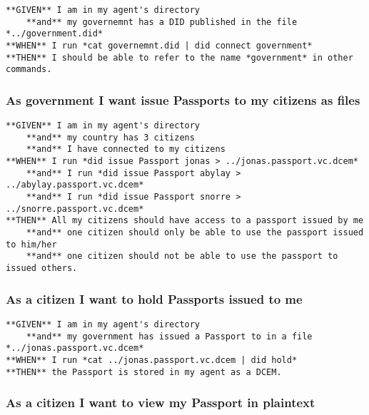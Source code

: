 \begin{lstlisting}
**GIVEN** I am in my agent's directory
    **and** my governemnt has a DID published in the file *../government.did*
**WHEN** I run *cat governemnt.did | did connect government*
**THEN** I should be able to refer to the name *government* in other commands.
\end{lstlisting}

\hypertarget{as-government-i-want-issue-passports-to-my-citizens-as-files}{%
\subsubsection{As government I want issue Passports to my citizens as
files}\label{as-government-i-want-issue-passports-to-my-citizens-as-files}}

\begin{lstlisting}
**GIVEN** I am in my agent's directory
    **and** my country has 3 citizens
    **and** I have connected to my citizens
**WHEN** I run *did issue Passport jonas > ../jonas.passport.vc.dcem*
    **and** I run *did issue Passport abylay > ../abylay.passport.vc.dcem*
    **and** I run *did issue Passport snorre > ../snorre.passport.vc.dcem*
**THEN** All my citizens should have access to a passport issued by me
    **and** one citizen should only be able to use the passport issued to him/her
    **and** one citizen should not be able to use the passport to issued others.
\end{lstlisting}

\hypertarget{as-a-citizen-i-want-to-hold-passports-issued-to-me}{%
\subsubsection{As a citizen I want to hold Passports issued to
me}\label{as-a-citizen-i-want-to-hold-passports-issued-to-me}}

\begin{lstlisting}
**GIVEN** I am in my agent's directory
    **and** my government has issued a Passport to in a file *../jonas.passport.vc.dcem*
**WHEN** I run *cat ../jonas.passport.vc.dcem | did hold*
**THEN** the Passport is stored in my agent as a DCEM.
\end{lstlisting}

\hypertarget{as-a-citizen-i-want-to-view-my-passport-in-plaintext}{%
\subsubsection{As a citizen I want to view my Passport in
plaintext}\label{as-a-citizen-i-want-to-view-my-passport-in-plaintext}}

